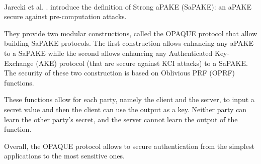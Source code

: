\documentclass[../report.tex]{subfiles}
\begin{document}
\paragraph{}
Jarecki et al. \cite{OPAQUE_Paper}. introduce the definition of Strong aPAKE (SaPAKE): an aPAKE secure against pre-computation attacks.

They provide two modular constructions, called the OPAQUE protocol that allow building SaPAKE protocols. The first construction allows enhancing any aPAKE to a SaPAKE while the second allows enhancing any Authenticated Key-Exchange (AKE) protocol (that are secure against KCI attacks) to a SaPAKE.
The security of these two construction is based on Oblivious PRF (OPRF) functions. %

These functions allow for each party, namely the client and the server, to input a secret value and then the client can use the output as a key. Neither party can learn the other party's secret, and the server cannot learn the output of the function.

Overall, the OPAQUE protocol allows to secure authentication from the simplest applications to the most sensitive ones.





% 
% 
% 


\paragraph{}
\end{document}
